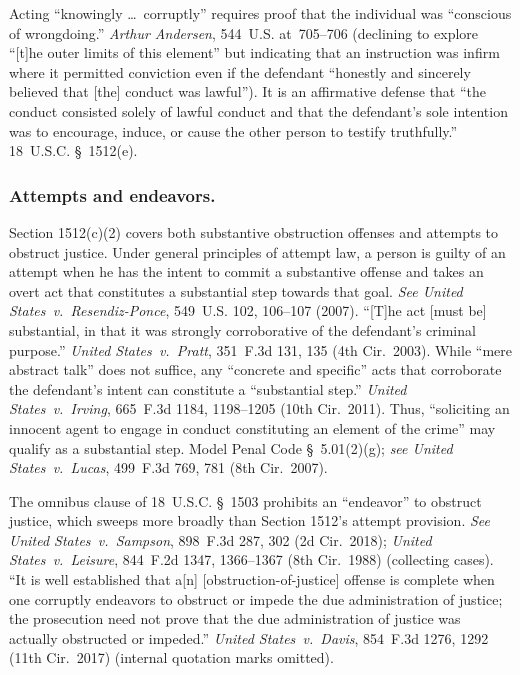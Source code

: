 Acting ``knowingly \dots\ corruptly'' requires proof that the individual was ``conscious of wrongdoing.''
\textit{Arthur Andersen}, 544~U.S. at~705--706 (declining to explore ``[t]he outer limits of this element'' but indicating that an instruction was infirm where it permitted conviction even if the defendant ``honestly and sincerely believed that [the] conduct was lawful'').
It is an affirmative defense that ``the conduct consisted solely of lawful conduct and that the defendant's sole intention was to encourage, induce, or cause the other person to testify truthfully.''
18~U.S.C. \S~1512(e).

\subsubsection*{Attempts and endeavors.}

Section 1512(c)(2) covers both substantive obstruction offenses and attempts to obstruct justice. Under general principles of attempt law, a person is guilty of an attempt when he has the intent to commit a substantive offense and takes an overt act that constitutes a substantial step towards that goal.
\textit{See United States~v.\ Resendiz-Ponce}, 549~U.S. 102, 106--107 (2007).
``[T]he act [must be] substantial, in that it was strongly corroborative of the defendant's criminal purpose.''
\textit{United States~v.\ Pratt}, 351~F.3d 131, 135 (4th Cir.~2003).
While ``mere abstract talk'' does not suffice, any ``concrete and specific'' acts that corroborate the defendant's intent can constitute a ``substantial step.''
\textit{United States~v.\ Irving}, 665~F.3d 1184, 1198--1205 (10th Cir.~2011).
Thus, ``soliciting an innocent agent to engage in conduct constituting an element of the crime'' may qualify as a substantial step.
Model Penal Code \S~5.01(2)(g);
\textit{see United States~v.\ Lucas}, 499~F.3d 769, 781 (8th Cir.~2007).

The omnibus clause of 18~U.S.C. \S~1503 prohibits an ``endeavor'' to obstruct justice, which sweeps more broadly than Section 1512's attempt provision.
\textit{See United States~v.\ Sampson}, 898~F.3d 287, 302 (2d Cir.~2018);
\textit{United States~v.\ Leisure}, 844~F.2d 1347, 1366--1367 (8th Cir.~1988) (collecting cases).
``It is well established that a[n] [obstruction-of-justice] offense is complete when one corruptly endeavors to obstruct or impede the due administration of justice;
the prosecution need not prove that the due administration of justice was actually obstructed or impeded.''
\textit{United States~v.\ Davis}, 854~F.3d 1276, 1292 (11th Cir.~2017) (internal quotation marks omitted).

